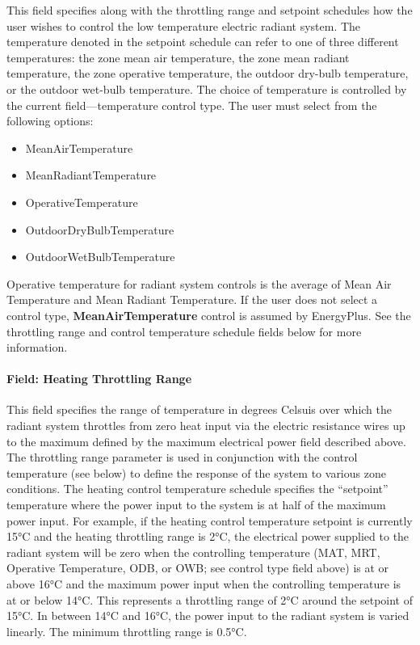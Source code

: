 This field specifies along with the throttling range and setpoint schedules how the user wishes to control the low temperature electric radiant system. The temperature denoted in the setpoint schedule can refer to one of three different temperatures: the zone mean air temperature, the zone mean radiant temperature, the zone operative temperature, the outdoor dry-bulb temperature, or the outdoor wet-bulb temperature. The choice of temperature is controlled by the current field---temperature control type. The user must select from the following options:

\begin{itemize}
\item
  MeanAirTemperature
\item
  MeanRadiantTemperature
\item
  OperativeTemperature
\item
  OutdoorDryBulbTemperature
\item
  OutdoorWetBulbTemperature
\end{itemize}

Operative temperature for radiant system controls is the average of Mean Air Temperature and Mean Radiant Temperature. If the user does not select a control type, \textbf{MeanAirTemperature} control is assumed by EnergyPlus. See the throttling range and control temperature schedule fields below for more information.

\paragraph{Field: Heating Throttling Range}\label{field-heating-throttling-range}

This field specifies the range of temperature in degrees Celsuis over which the radiant system throttles from zero heat input via the electric resistance wires up to the maximum defined by the maximum electrical power field described above. The throttling range parameter is used in conjunction with the control temperature (see below) to define the response of the system to various zone conditions. The heating control temperature schedule specifies the ``setpoint'' temperature where the power input to the system is at half of the maximum power input. For example, if the heating control temperature setpoint is currently 15°C and the heating throttling range is 2°C, the electrical power supplied to the radiant system will be zero when the controlling temperature (MAT, MRT, Operative Temperature, ODB, or OWB; see control type field above) is at or above 16°C and the maximum power input when the controlling temperature is at or below 14°C. This represents a throttling range of 2°C around the setpoint of 15°C. In between 14°C and 16°C, the power input to the radiant system is varied linearly. The minimum throttling range is 0.5°C.

